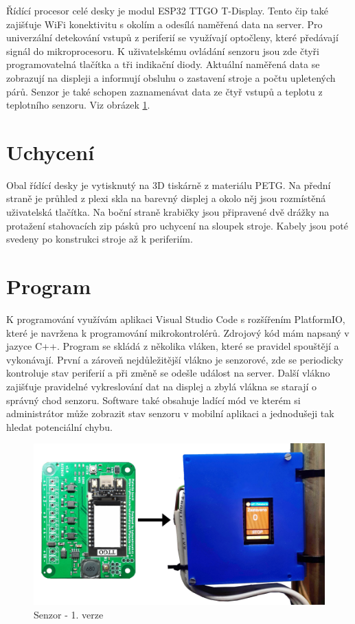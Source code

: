 Řídící procesor celé desky je modul ESP32 TTGO T-Display.
Tento čip také zajišťuje WiFi konektivitu s okolím a odesílá naměřená data na server.
Pro univerzální detekování vstupů z periferií se využívají optočleny, které předávají signál do mikroprocesoru.
K uživatelskému ovládání senzoru jsou zde čtyři programovatelná tlačítka a tři indikační diody.
Aktuální naměřená data se zobrazují na displeji a informují obsluhu o zastavení stroje a počtu upletených párů.
Senzor je také schopen zaznamenávat data ze čtyř vstupů a teplotu z teplotního senzoru. Viz obrázek \ref{fig:SenzorV1.0NaStroji}.

\section{Uchycení}
Obal řídící desky je vytisknutý na 3D tiskárně z materiálu PETG.
Na přední straně je průhled z plexi skla na barevný displej a okolo něj jsou rozmístěná uživatelská tlačítka.
Na boční straně krabičky jsou připravené dvě drážky na protažení stahovacích zip pásků pro uchycení na sloupek stroje.
Kabely jsou poté svedeny po konstrukci stroje až k periferiím.


\section{Program}
K programování využívám aplikaci Visual Studio Code s rozšířením PlatformIO, které je navržena k programování mikrokontrolérů. 
Zdrojový kód mám napsaný v jazyce C++.
Program se skládá z několika vláken, které se pravidel \fxnote[author=JPA]{\textcolor{mygreen}{"pravidel" => pravidelně/podle pravidel}}
spouštějí a vykonávají.
První a zároveň nejdůležitější vlákno je senzorové, zde se periodicky kontroluje stav periferií a při změně se odešle událost na server.
Další vlákno zajišťuje pravidelné vykreslování dat na displej a zbylá vlákna se starají o správný chod senzoru.
Software také obsahuje ladící mód ve kterém si administrátor může zobrazit stav senzoru v mobilní aplikaci a jednodušeji tak hledat potenciální chybu. 


\fxnote[author=JA]{\textcolor{mygreen}{Obrázek deksa => krabička}}

\begin{figure}[htbp]
    \centering
    \includegraphics[width=\textwidth]{img/SenzorV1.png}
    \caption{Senzor - 1. verze}
    \label{fig:SenzorV1.0NaStroji}
\end{figure}

